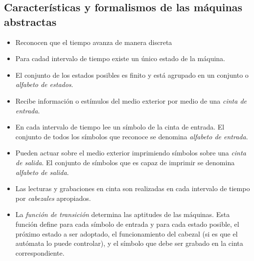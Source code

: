 \documentclass[12pt]{article}
\begin{document}
\subsection{Características y formalismos de las máquinas abstractas}
\begin{itemize}
	\item Reconocen que el tiempo avanza de manera discreta

	\item Para cadad intervalo de tiempo existe un único estado de la máquina.

	\item El conjunto de los estados posibles es finito y está agrupado en un conjunto o \textit{alfabeto de estados}.

	\item Recibe información o estímulos del medio exterior por medio de una \textit{cinta de entrada}.

	\item En cada intervalo de tiempo lee un símbolo de la cinta de entrada. El conjunto de todos los símbolos que reconoce se denomina \textit{alfabeto de entrada}.

	\item Pueden actuar sobre el medio exterior imprimiendo símbolos sobre una \textit{cinta de salida}. El conjunto de símbolos que es capaz de imprimir se denomina \textit{alfabeto de salida}.

	\item Las lecturas y grabaciones en cinta son realizadas en cada intervalo de tiempo por \textit{cabezales} apropiados.

	\item La \textit{función de transición} determina las aptitudes de las máquinas. Esta función define para cada símbolo de entrada y para cada estado posible, el próximo estado a ser adoptado, el funcionamiento del cabezal (si es que el autómata lo puede controlar), y el símbolo que debe ser grabado en la cinta correspondiente.
\end{itemize}
\end{document}
